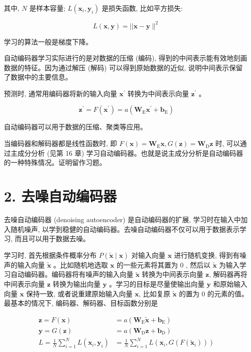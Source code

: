\documentclass[10pt]{article}
\begin{document}
其中, $N$ 是样本容量; $L\left(\boldsymbol{x}_{i}, \boldsymbol{y}_{i}\right)$ 是损失函数, 比如平方损失:

$$
L(\boldsymbol{x}, \boldsymbol{y})=|| \boldsymbol{x}-\boldsymbol{y} \|^{2}
$$

学习的算法一般是梯度下降。

自动编码器学习实际进行的是对数据的压缩 (编码), 得到的中间表示能有效地刻画数据的特征。因为通过解压 (解码) 可以得到原始数据的近似, 说明中间表示保留了数据中的主要信息。

预测时, 通常用编码器将新的输入向量 $\boldsymbol{x}^{\prime}$ 转换为中间表示向量 $\boldsymbol{z}^{\prime}$ 。


\begin{equation*}
\boldsymbol{z}^{\prime}=F\left(\boldsymbol{x}^{\prime}\right)=a\left(\boldsymbol{W}_{\mathrm{E}} \boldsymbol{x}^{\prime}+\boldsymbol{b}_{\mathrm{E}}\right) \tag{27.16}
\end{equation*}


自动编码器可以用于数据的压缩、聚类等应用。

当编码器和解码器都是线性函数时, 即 $F(\boldsymbol{x})=\boldsymbol{W}_{\mathrm{E}} \boldsymbol{x}, G(\boldsymbol{z})=\boldsymbol{W}_{\mathrm{D}} \boldsymbol{z}$ 时, 可以通过主成分分析 (见第 16 章) 学习自动编码器。也就是说主成分分析是自动编码器的一种特殊情况。证明留作习题。

\section*{2. 去噪自动编码器}
去噪自动编码器 (denoising autoencoder) 是自动编码器的扩展, 学习时在输入中加入随机噪声, 以学到稳健的自动编码器。去噪自动编码器不仅可以用于数据表示学习, 而且可以用于数据去噪。

学习时, 首先根据条件概率分布 $P(\tilde{\boldsymbol{x}} \mid \boldsymbol{x})$ 对输入向量 $\boldsymbol{x}$ 进行随机变换, 得到有噪声的输入向量 $\tilde{\boldsymbol{x}}$ 。比如随机地选取 $\boldsymbol{x}$ 的一些元素将其置为 0 , 然后以 $\tilde{\boldsymbol{x}}$ 为输入学习自动编码器。编码器将有噪声的输入向量 $\tilde{\boldsymbol{x}}$ 转换为中间表示向量 $\boldsymbol{z}$, 解码器再将中间表示向量 $\boldsymbol{z}$ 转换为输出向量 $\boldsymbol{y}$ 。学习的目标是尽量使输出向量 $\boldsymbol{y}$ 和原始输入向量 $\boldsymbol{x}$ 保持一致, 或者说重建原始输入向量 $\boldsymbol{x}$, 比如复原 $\tilde{\boldsymbol{x}}$ 的置为 0 的元素的值。最基本的情况下, 编码器、解码器、目标函数分别是


\begin{align*}
\boldsymbol{z}=F(\boldsymbol{x}) & =a\left(\boldsymbol{W}_{\mathrm{E}} \tilde{\boldsymbol{x}}+\boldsymbol{b}_{\mathrm{E}}\right)  \tag{27.17}\\
\boldsymbol{y}=G(\boldsymbol{z}) & =a\left(\boldsymbol{W}_{\mathrm{D}} \boldsymbol{z}+\boldsymbol{b}_{\mathrm{D}}\right)  \tag{27.18}\\
L=\frac{1}{N} \sum_{i=1}^{N} L\left(\boldsymbol{x}_{i}, \boldsymbol{y}_{i}\right) & =\frac{1}{N} \sum_{i=1}^{N} L\left(\boldsymbol{x}_{i}, G\left(F\left(\tilde{\boldsymbol{x}}_{i}\right)\right)\right) \tag{27.19}
\end{align*}
\end{document}
